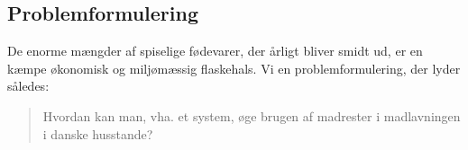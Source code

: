 \subsection{Problemformulering}
\label{subsec:problemformulering}
De enorme mængder af spiselige fødevarer, der årligt bliver smidt ud, er en kæmpe økonomisk og miljømæssig flaskehals. Vi en problemformulering, der lyder således:

\begin{quote}
Hvordan kan man, vha. et system, øge brugen af madrester i madlavningen i danske husstande?
\end{quote} 
